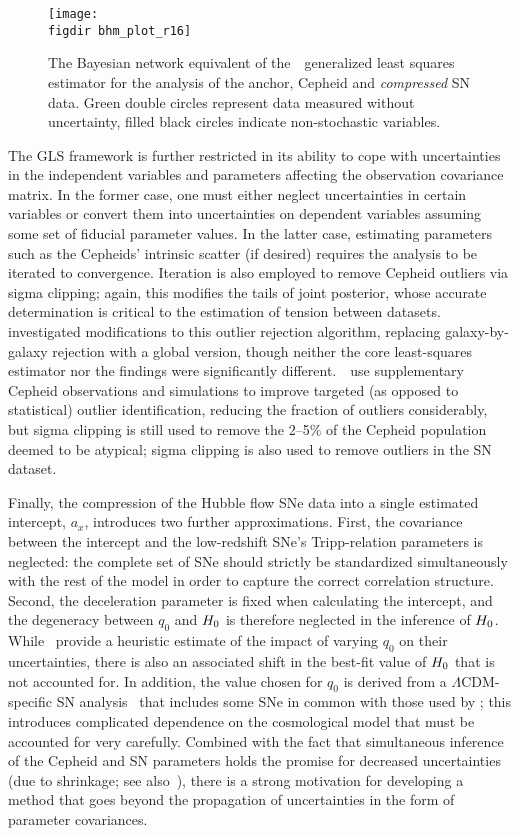 \documentclass[a4paper,fleqn,usenatbib]{mnras}
\newcommand{\riess}{\citetalias{Riess_etal:2016}}
\newcommand{\decel}{\ensuremath{q_0}}
\begin{document}
{\begin{figure*}
\texttt{[image: \\figdir bhm\_plot\_r16]}
\caption{The Bayesian network equivalent of the~\riess\ generalized least squares estimator for the analysis of the anchor, Cepheid and {\em compressed} SN data. Green double circles represent data measured without uncertainty, filled black circles indicate non-stochastic variables.}
\label{figure:network_r16}
\end{figure*}

The GLS framework is further restricted in its ability to cope with uncertainties in the independent variables and parameters affecting the observation covariance matrix. In the former case, one must either neglect uncertainties in certain variables or convert them into uncertainties on dependent variables assuming some set of fiducial parameter values. In the latter case, estimating parameters such as the Cepheids' intrinsic scatter (if desired) requires the analysis to be iterated to convergence. Iteration is also employed to remove Cepheid outliers via sigma clipping; again, this modifies the tails of joint posterior, whose accurate determination is critical to the estimation of tension between datasets. \cite{Efstathiou:2014} investigated modifications to this outlier rejection algorithm, replacing galaxy-by-galaxy rejection with a global version, though neither the core least-squares estimator nor the findings were significantly different.~\riess\ use supplementary Cepheid observations and simulations to improve targeted (as opposed to statistical) outlier identification, reducing the fraction of outliers considerably, but sigma clipping is still used to remove the 2--5\% of the Cepheid population deemed to be atypical; sigma clipping is also used to remove outliers in the SN dataset.

Finally, the compression of the Hubble flow SNe data into a single estimated intercept, $a_x$, introduces two further approximations. First, the covariance between the intercept and the low-redshift SNe's Tripp-relation parameters is neglected: the complete set of SNe should strictly be standardized simultaneously with the rest of the model in order to capture the correct correlation structure. Second, the deceleration parameter is fixed when calculating the intercept, and the degeneracy between $\decel$ and $H_0$ is therefore neglected in the inference of $H_0$. While \riess\ provide a heuristic estimate of the impact of varying $\decel$ on their uncertainties, there is also an associated shift in the best-fit value of $H_0$ that is not accounted for. In addition, the value chosen for $\decel$ is derived from a $\Lambda$CDM-specific SN analysis~\citep{Betoule_etal:2014} that includes some SNe in common with those used by \riess; this introduces complicated dependence on the cosmological model that must be accounted for very carefully.  Combined with the fact that simultaneous inference of the Cepheid and SN parameters holds the promise for decreased uncertainties (due to shrinkage; see also~\citet{Zhang_etal:2017}), there is a strong motivation for developing a method that goes beyond the propagation of uncertainties in the form of parameter covariances.

}
\end{document}
